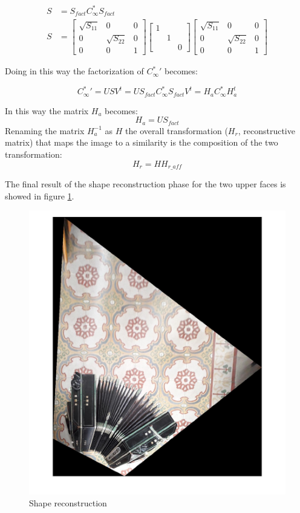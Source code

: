 \documentclass[11pt, oneside]{article}   	%
\begin{document}
\begin{subequations}
\begin{align*}
S & = S_{fact} C_{\infty}^* S_{fact} \\
S & = \begin{bmatrix} \sqrt{S_{11}} & 0& 0 \\ 0 & \sqrt{S_{22}}  & 0   \\ 0 & 0 & 1 \end{bmatrix} \begin{bmatrix} 1 && \\&1&\\&&0\end{bmatrix} \begin{bmatrix} \sqrt{S_{11}} & 0& 0 \\ 0 & \sqrt{S_{22}} & 0   \\ 0 & 0 & 1 \end{bmatrix} 
\end{align*}
\end{subequations}

Doing in this way the factorization of $C^*_{\infty}{'}$ becomes:

$$
C^*_{\infty}{'} = USV^{t} = U S_{fact} C_{\infty}^* S_{fact} V^{t} = H_a C^*_{\infty} H_a^t 
$$

In this way the matrix $H_a$ becomes:
$$
H_a = U S_{fact}
$$
Renaming the matrix $H_a^{-1}$ as $H$  the overall transformation ($H_r$, reconstructive matrix) that maps the image to a similarity is the composition of the two transformation:
$$
H_r = H H_{r\_aff} 
$$

The final result of the shape reconstruction phase for the two upper faces is showed in figure \ref{shaperec}.

\begin{figure}
\includegraphics[width=0.8\linewidth]{shape_rec_rotated.jpg}
\caption{Shape reconstruction}
\label{shaperec}
\end{figure}
\end{document}
